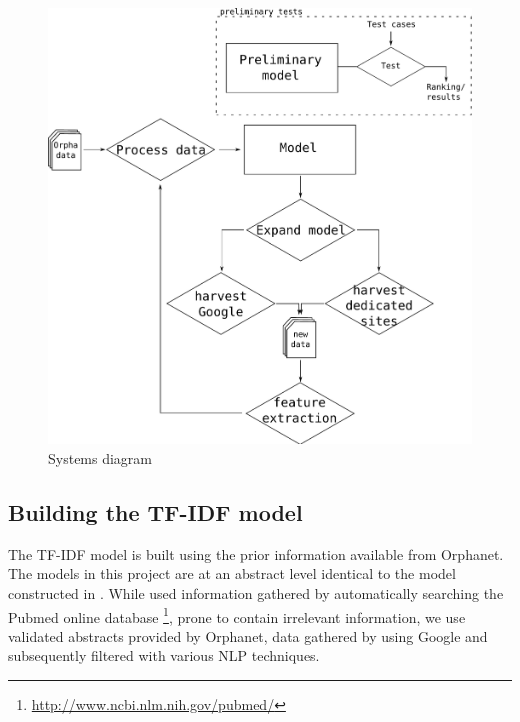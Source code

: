 \documentclass[10pt,letterpaper,final]{article}
\begin{document}
\begin{figure}[htp!]
\begin{center}
\includegraphics[scale=0.4]{images/pipeline}
\caption{Systems diagram}
\label{fig:flow}
\end{center}
\end{figure}



\subsection{Building the TF-IDF model}
\label{chap:basicmodel}
The TF-IDF model is built using the prior information available
from Orphanet. The models in this project are at an abstract level
identical to the model constructed in \cite{jensenandersen}. While
\cite{jensenandersen} used information gathered by automatically
searching the Pubmed online database
\footnote{\url{http://www.ncbi.nlm.nih.gov/pubmed/}}, prone to contain
irrelevant information, we use validated abstracts provided by Orphanet,
data gathered by using Google and subsequently filtered with various
NLP techniques.
\end{document}
